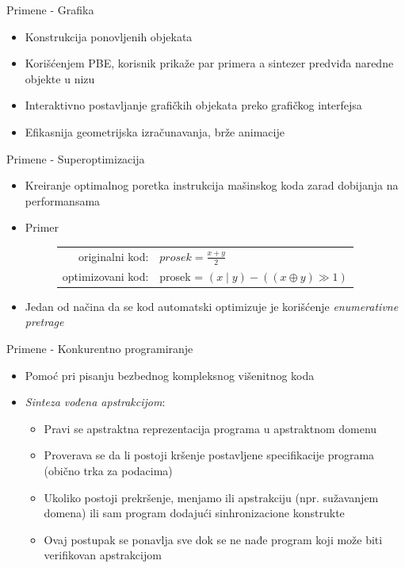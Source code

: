 \documentclass{beamer}
\begin{document}
\begin{frame}{Primene - Grafika}
    \begin{itemize}
        \item Konstrukcija ponovljenih objekata
        \item Korišćenjem PBE, korisnik prikaže par primera a sintezer predviđa naredne objekte u nizu
        \item Interaktivno postavljanje grafičkih objekata preko grafičkog interfejsa
        \item Efikasnija geometrijska izračunavanja, brže animacije
    \end{itemize}
\end{frame}


\begin{frame}{Primene - Superoptimizacija}
    \begin{itemize}
        \item Kreiranje optimalnog poretka instrukcija mašinskog koda zarad dobijanja na performansama
        \item Primer
        \begin{figure}[!h]
            \centering
            \small
            \begin{tabular}{rl}
                originalni kod: & $\mathit{prosek}=\frac{x+y}{2}$\\
                optimizovani kod: & prosek = $(x \mid y)-((x \oplus y) \gg 1)$
            \end{tabular}
        \end{figure}
        \item Jedan od načina da se kod automatski optimizuje je korišćenje  \emph{enumerativne pretrage}
    \end{itemize}
\end{frame}

\begin{frame}{Primene - Konkurentno programiranje}
    \begin{itemize}
        \item Pomoć pri pisanju bezbednog kompleksnog višenitnog koda
        \item \emph{Sinteza vođena apstrakcijom}:
        \begin{itemize}
            \item Pravi se apstraktna reprezentacija programa u apstraktnom domenu
            \item Proverava se da li postoji kršenje postavljene specifikacije programa (obično trka za podacima)
            \item Ukoliko postoji prekršenje, menjamo ili apstrakciju (npr. sužavanjem domena) ili sam program dodajući sinhronizacione konstrukte
            \item Ovaj postupak se ponavlja sve dok se ne nađe program koji može biti verifikovan apstrakcijom
        \end{itemize}
    \end{itemize}
\end{frame}
\end{document}
